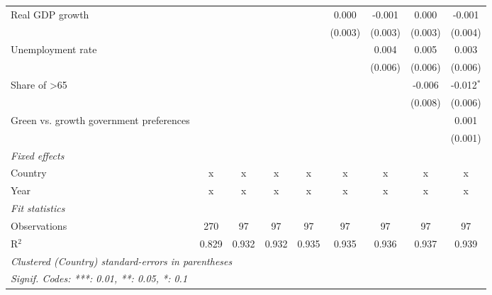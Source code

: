 \begin{table}[htbp]
\begin{tabular}{lcccccccc}
      Real GDP growth                                       &         &               &               &                & 0.000          & -0.001        & 0.000          & -0.001\\   
                                                            &         &               &               &                & (0.003)        & (0.003)       & (0.003)        & (0.004)\\   
      Unemployment rate                                     &         &               &               &                &                & 0.004         & 0.005          & 0.003\\   
                                                            &         &               &               &                &                & (0.006)       & (0.006)        & (0.006)\\   
      Share of >65                                          &         &               &               &                &                &               & -0.006         & -0.012$^{*}$\\   
                                                            &         &               &               &                &                &               & (0.008)        & (0.006)\\   
      Green vs. growth government preferences               &         &               &               &                &                &               &                & 0.001\\   
                                                            &         &               &               &                &                &               &                & (0.001)\\   
      \emph{Fixed effects}\\
      Country                                               & x       & x             & x             & x              & x              & x             & x              & x\\  
      Year                                                  & x       & x             & x             & x              & x              & x             & x              & x\\  
      \midrule \emph{Fit statistics}\\
      Observations                                          & 270     & 97            & 97            & 97             & 97             & 97            & 97             & 97\\  
      R$^2$                                                 & 0.829   & 0.932         & 0.932         & 0.935          & 0.935          & 0.936         & 0.937          & 0.939\\  
      \midrule
      \multicolumn{9}{l}{\emph{Clustered (Country) standard-errors in parentheses}}\\
      \multicolumn{9}{l}{\emph{Signif. Codes: ***: 0.01, **: 0.05, *: 0.1}}\\
   \end{tabular}
\end{table}


